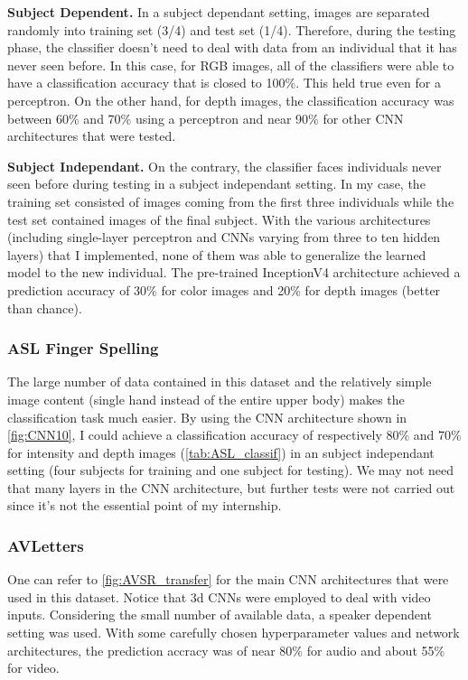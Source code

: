 \textbf{Subject Dependent.}
In a subject dependant setting, images are separated randomly into
training set (3/4) and test set (1/4). Therefore, during the
testing phase, the classifier doesn't need to deal with data from an
individual that it has never seen before.
In this case, for RGB images, all of the classifiers were able to
have a classification accuracy that is closed to 100\%. This held true
even for a perceptron.
On the other hand, for depth images, the classification accuracy was
between 60\% and 70\% using a perceptron and near 90\% for other CNN
architectures that were tested.

\textbf{Subject Independant.}
On the contrary, the classifier faces individuals never seen before
during testing in a subject independant setting. 
In my case, the training set consisted of images coming from the
first three individuals while the test set contained images of
the final subject.
With the various architectures (including single-layer perceptron
and CNNs varying from three to ten hidden layers)
that I implemented, none of them was able to generalize the learned model
to the new individual.
The pre-trained InceptionV4 architecture \cite{C. Szegedy 2017}
achieved a prediction accuracy
of 30\% for color images and 20\% for depth images (better than chance).

\subsubsection{ASL Finger Spelling} \label{subsubsection:ASL_CNN}

The large number of data contained in this dataset and the relatively
simple image content (single hand instead of the entire upper body)
makes the classification task much easier. By using the CNN architecture
shown in \autoref{fig:CNN10}, I could achieve a classification accuracy
of respectively 80\% and 70\% for intensity and depth images
(\autoref{tab:ASL_classif})
in an subject independant setting (four subjects for training and one
subject for testing). We may not need that many layers in the CNN
architecture, but further tests were not carried out since it's not
the essential point of my internship.

\subsubsection{AVLetters}

One can refer to \autoref{fig:AVSR_transfer} for the main CNN architectures
that were used in this dataset. 
Notice that 3d CNNs were employed to deal with video inputs.
Considering the small number of available data, a speaker dependent
setting was used.
With some carefully chosen hyperparameter values and network architectures,
the prediction accracy was of near 80\% for audio and about 55\% for video.

